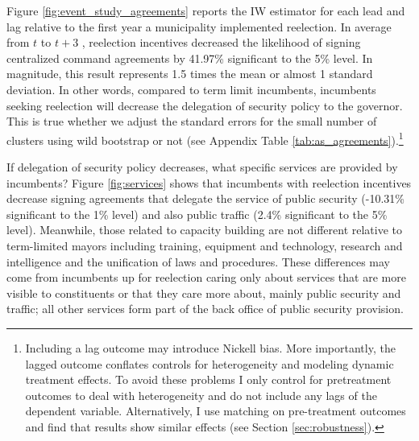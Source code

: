 \documentclass[12pt]{amsart}
\makeatletter
\def\section{\@startsection{section}{1}
	\z@{1.0\linespacing\@plus\linespacing}{.5\linespacing}{\Large}}
\numberwithin{equation}{section}
\theoremstyle{definition}
\theoremstyle{definition}
\theoremstyle{definition}
\makeatother
\begin{document}
\section{Main Results \label{sec:results}}


   
Figure \ref{fig:event_study_agreements} reports the IW estimator %
 for each lead and lag relative to the first year a municipality implemented reelection. In average from $t$ to $t+3$ , reelection incentives decreased the likelihood of signing centralized command agreements by 41.97\% significant to the 5\% level. In magnitude, this result represents 1.5 times the mean or almost 1 standard deviation. In other words, compared to term limit incumbents, incumbents seeking reelection will decrease the delegation of security policy to the governor. This is true whether we adjust the standard errors for the small number of clusters using wild bootstrap or not (see Appendix Table \ref{tab:as_agreements}).\footnote{Including a lag outcome may introduce Nickell bias. More importantly, the lagged outcome conflates controls for heterogeneity and modeling dynamic treatment effects. To avoid these problems I only control for pretreatment outcomes to deal with heterogeneity and do not include  any lags of the dependent variable. Alternatively, I use matching on pre-treatment outcomes and find that results show similar effects (see Section \ref{sec:robustness}).}   
         
     
If delegation of security policy decreases, what specific services are provided by incumbents? Figure \ref{fig:services} shows that incumbents with reelection incentives decrease signing agreements that delegate the service of public security (-10.31\% significant to the 1\% level) and also public traffic (2.4\% significant to the 5\% level). Meanwhile, those related to capacity building are not different relative to term-limited mayors including training, equipment and technology, research and intelligence and the unification of laws and procedures. These differences may come from incumbents up for reelection caring only about services that are more visible to constituents or that they care more about, mainly public security and traffic; all other services form part of the back office of public security provision.  
\end{document}
